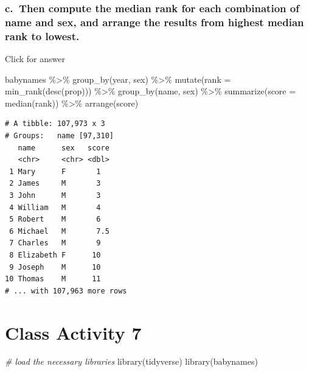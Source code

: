 \documentclass[
]{book}
\newenvironment{Shaded}{\begin{snugshade}}{\end{snugshade}}
\newcommand{\AttributeTok}[1]{\textcolor[rgb]{0.77,0.63,0.00}{#1}}
\newcommand{\CommentTok}[1]{\textcolor[rgb]{0.56,0.35,0.01}{\textit{#1}}}
\newcommand{\FunctionTok}[1]{\textcolor[rgb]{0.00,0.00,0.00}{#1}}
\newcommand{\NormalTok}[1]{#1}
\newcommand{\SpecialCharTok}[1]{\textcolor[rgb]{0.00,0.00,0.00}{#1}}
\begin{document}
\hypertarget{c.-then-compute-the-median-rank-for-each-combination-of-name-and-sex-and-arrange-the-results-from-highest-median-rank-to-lowest.}{%
\subsection{c.~Then compute the median rank for each combination of name and sex, and arrange the results from highest median rank to lowest.}\label{c.-then-compute-the-median-rank-for-each-combination-of-name-and-sex-and-arrange-the-results-from-highest-median-rank-to-lowest.}}

Click for answer

\begin{Shaded}
\begin{Highlighting}[]
\NormalTok{babynames }\SpecialCharTok{\%\textgreater{}\%} 
  \FunctionTok{group\_by}\NormalTok{(year, sex) }\SpecialCharTok{\%\textgreater{}\%} 
  \FunctionTok{mutate}\NormalTok{(}\AttributeTok{rank =} \FunctionTok{min\_rank}\NormalTok{(}\FunctionTok{desc}\NormalTok{(prop))) }\SpecialCharTok{\%\textgreater{}\%}
  \FunctionTok{group\_by}\NormalTok{(name, sex) }\SpecialCharTok{\%\textgreater{}\%}
  \FunctionTok{summarize}\NormalTok{(}\AttributeTok{score =} \FunctionTok{median}\NormalTok{(rank)) }\SpecialCharTok{\%\textgreater{}\%}
  \FunctionTok{arrange}\NormalTok{(score) }
\end{Highlighting}
\end{Shaded}

\begin{verbatim}
# A tibble: 107,973 x 3
# Groups:   name [97,310]
   name      sex   score
   <chr>     <chr> <dbl>
 1 Mary      F       1  
 2 James     M       3  
 3 John      M       3  
 4 William   M       4  
 5 Robert    M       6  
 6 Michael   M       7.5
 7 Charles   M       9  
 8 Elizabeth F      10  
 9 Joseph    M      10  
10 Thomas    M      11  
# ... with 107,963 more rows
\end{verbatim}

\hypertarget{class-activity-7}{%
\chapter{Class Activity 7}\label{class-activity-7}}

\begin{Shaded}
\begin{Highlighting}[]
\CommentTok{\# load the necessary libraries}
\FunctionTok{library}\NormalTok{(tidyverse)}
\FunctionTok{library}\NormalTok{(babynames)}
\end{Highlighting}
\end{Shaded}
\end{document}
